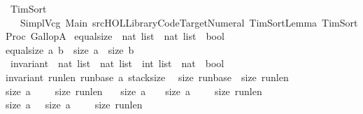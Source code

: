 %
\begin{isabellebody}%
%
%
\isadelimtheory
%
\endisadelimtheory
%
\isatagtheory
{}\isamarkupfalse%
\ TimSort\isanewline
\ \ \ {\isachardoublequoteopen}{\isachardot}{\isachardot}{\isacharslash}Simpl{\isacharslash}Vcg{\isachardoublequoteclose}\ Main\ {\isachardoublequoteopen}{\isachartilde}{\isachartilde}{\isacharslash}src{\isacharslash}HOL{\isacharslash}Library{\isacharslash}Code{\isacharunderscore}Target{\isacharunderscore}Numeral{\isachardoublequoteclose}\ {\isachardoublequoteopen}TimSortLemma{\isachardoublequoteclose}\ {\isachardoublequoteopen}TimSortProc{\isachardoublequoteclose}\ {\isachardoublequoteopen}GallopA{\isachardoublequoteclose}\isanewline
{}%
\endisatagtheory
{\isafoldtheory}%
%
\isadelimtheory
\isanewline
%
\endisadelimtheory
\isanewline
{}\isamarkupfalse%
\ equal{\isacharunderscore}size\ {\isacharcolon}{\isacharcolon}\ {\isachardoublequoteopen}nat\ list\ {\isasymRightarrow}\ nat\ list\ {\isasymRightarrow}\ bool{\isachardoublequoteclose}\ \isanewline
{\isachardoublequoteopen}equal{\isacharunderscore}size\ a\ b\ {\isacharequal}\ {\isacharparenleft}size\ a\ {\isacharequal}\ size\ b{\isacharparenright}{\isachardoublequoteclose}\isanewline
\isanewline
{}\isamarkupfalse%
\ invariant\ {\isacharcolon}{\isacharcolon}\ {\isachardoublequoteopen}nat\ list\ {\isasymRightarrow}\ nat\ list\ {\isasymRightarrow}\ int\ list\ {\isasymRightarrow}\ nat\ {\isasymRightarrow}\ bool{\isachardoublequoteclose}\ \ \isanewline
{\isachardoublequoteopen}invariant\ run{\isacharunderscore}len\ run{\isacharunderscore}base\ a\ stack{\isacharunderscore}size\ {\isasymequiv}\ \isanewline
{\isacharparenleft}size\ {\isacharparenleft}run{\isacharunderscore}base{\isacharparenright}\ {\isacharequal}\ size\ {\isacharparenleft}run{\isacharunderscore}len{\isacharparenright}{\isacharparenright}\ {\isasymand}\isanewline
{\isacharparenleft}size\ a\ {\isacharless}\ {}{}{}\ {\isasymlongrightarrow}\ \ size\ run{\isacharunderscore}len\ {\isacharequal}\ {}{\isacharparenright}\ {\isasymand}\isanewline
{\isacharparenleft}size\ a\ {\isasymge}\ {}{}{}\ {\isasymand}\ size\ a\ {\isacharless}\ {}{}{}{}\ {\isasymlongrightarrow}\ \ size\ run{\isacharunderscore}len\ {\isacharequal}\ {}{\isacharparenright}\ {\isasymand}\isanewline
{\isacharparenleft}size\ a\ {\isasymge}{}{}{}{}\ {\isasymand}\ size\ a\ {\isacharless}\ {}{}{}{}{}{}\ {\isasymlongrightarrow}\ \ size\ run{\isacharunderscore}len\ {\isacharequal}\ {}{}{\isacharparenright}\ {\isasymand}\isanewline

\end{isabellebody}
